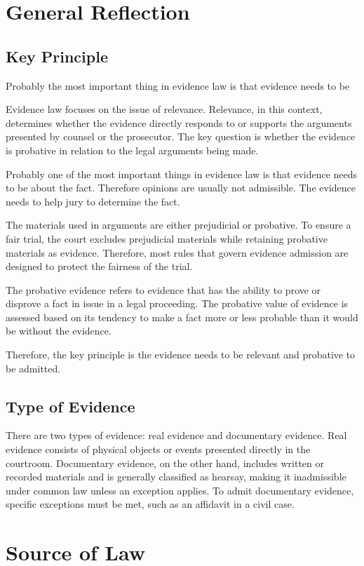 \section*{General Reflection}

\subsection*{Key Principle}
Probably the most important thing in evidence law is that evidence needs to be 

Evidence law focuses on the issue of relevance. Relevance, in this context, determines whether the evidence directly responds to or supports the arguments presented by counsel or the prosecutor. The key question is whether the evidence is probative in relation to the legal arguments being made.

Probably one of the most important things in evidence law is that evidence needs to be about the fact. Therefore opinions are usually not admissible. The evidence needs to help jury to determine the fact. 

The materials used in arguments are either prejudicial or probative. To ensure a fair trial, the court excludes prejudicial materials while retaining probative materials as evidence. Therefore, most rules that govern evidence admission are designed to protect the fairness of the trial.  

The probative evidence refers to evidence that has the ability to prove or disprove a fact in issue in a legal proceeding. The probative value of evidence is assessed based on its tendency to make a fact more or less probable than it would be without the evidence.

Therefore, the key principle is the evidence needs to be relevant and probative to be admitted. 

\subsection*{Type of Evidence}
There are two types of evidence: real evidence and documentary evidence. Real evidence consists of physical objects or events presented directly in the courtroom. Documentary evidence, on the other hand, includes written or recorded materials and is generally classified as hearsay, making it inadmissible under common law unless an exception applies. To admit documentary evidence, specific exceptions must be met, such as an affidavit in a civil case.
\newpage
\section*{Source of Law}
